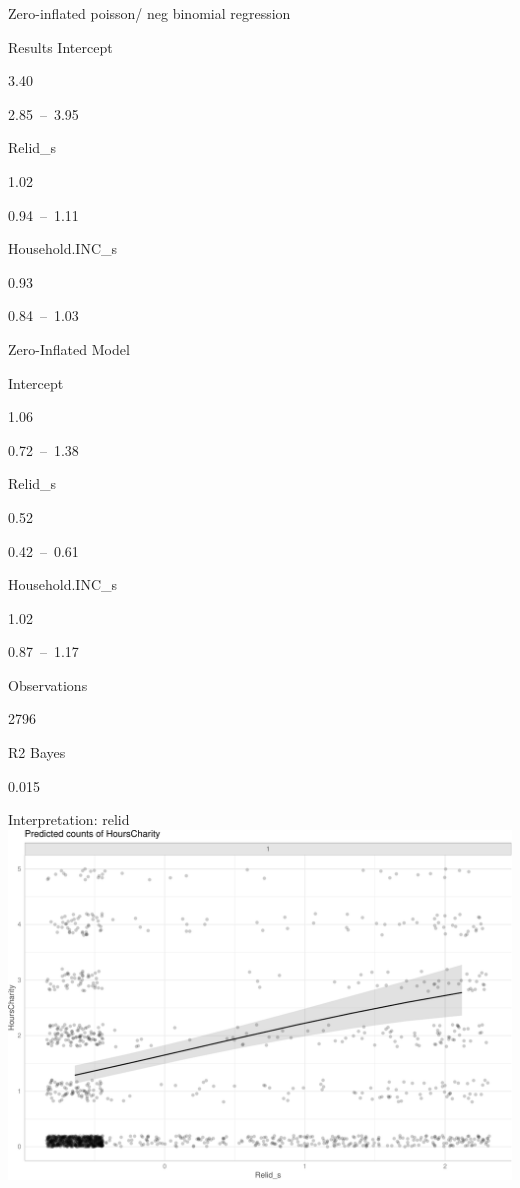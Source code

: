 \documentclass[
  ignorenonframetext,
]{beamer}
\begin{document}
\begin{frame}[fragile]{Zero-inflated poisson/ neg binomial regression}
\begin{block}{Results}
Intercept

3.40

2.85~--~3.95

Relid\_s

1.02

0.94~--~1.11

Household.INC\_s

0.93

0.84~--~1.03

Zero-Inflated Model

Intercept

1.06

0.72~--~1.38

Relid\_s

0.52

0.42~--~0.61

Household.INC\_s

1.02

0.87~--~1.17

Observations

2796

R2 Bayes

0.015
\end{block}

\begin{block}{Interpretation: relid}
\protect\hypertarget{interpretation-relid}{}
\includegraphics{slides_files/figure-beamer/unnamed-chunk-63-1.pdf}
\end{block}


\end{frame}
\end{document}

